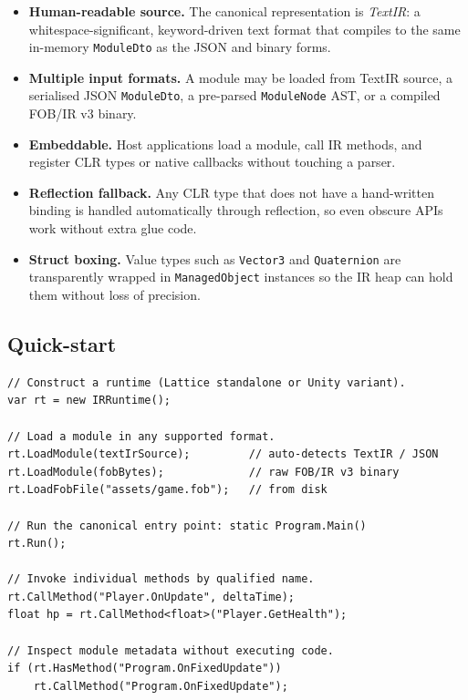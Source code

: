 \documentclass[11pt,a4paper]{article}
\newcommand{\typename}[1]{\textcolor{typecolor}{\texttt{\small #1}}}
\begin{document}
\begin{itemize}[leftmargin=1.8em]
  \item \textbf{Human-readable source.} The canonical representation is
    \emph{TextIR}: a whitespace-significant, keyword-driven text format that
    compiles to the same in-memory \typename{ModuleDto} as the JSON and binary
    forms.
  \item \textbf{Multiple input formats.} A module may be loaded from TextIR
    source, a serialised JSON \typename{ModuleDto}, a pre-parsed
    \typename{ModuleNode} AST, or a compiled FOB/IR v3 binary.
  \item \textbf{Embeddable.} Host applications load a module, call IR methods,
    and register CLR types or native callbacks without touching a parser.
  \item \textbf{Reflection fallback.} Any CLR type that does not have a
    hand-written binding is handled automatically through reflection, so even
    obscure APIs work without extra glue code.
  \item \textbf{Struct boxing.} Value types such as \typename{Vector3} and
    \typename{Quaternion} are transparently wrapped in \typename{ManagedObject}
    instances so the IR heap can hold them without loss of precision.
\end{itemize}

\subsection{Quick-start}

\begin{lstlisting}[style=cs, caption={Minimal embedding example}]
// Construct a runtime (Lattice standalone or Unity variant).
var rt = new IRRuntime();

// Load a module in any supported format.
rt.LoadModule(textIrSource);         // auto-detects TextIR / JSON
rt.LoadModule(fobBytes);             // raw FOB/IR v3 binary
rt.LoadFobFile("assets/game.fob");   // from disk

// Run the canonical entry point: static Program.Main()
rt.Run();

// Invoke individual methods by qualified name.
rt.CallMethod("Player.OnUpdate", deltaTime);
float hp = rt.CallMethod<float>("Player.GetHealth");

// Inspect module metadata without executing code.
if (rt.HasMethod("Program.OnFixedUpdate"))
    rt.CallMethod("Program.OnFixedUpdate");
\end{lstlisting}
\end{document}
